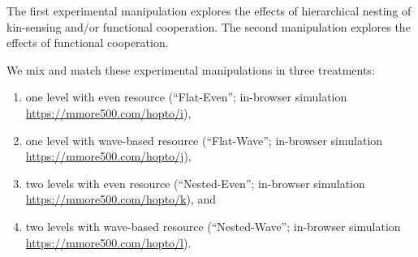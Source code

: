 The first experimental manipulation explores the effects of hierarchical nesting of kin-sensing and/or functional cooperation.
The second manipulation explores the effects of functional cooperation.

We mix and match these experimental manipulations in three treatments:
\begin{enumerate}
\item one level with even resource (``Flat-Even''; in-browser simulation \url{https://mmore500.com/hopto/i}),
\item one level with wave-based resource (``Flat-Wave''; in-browser simulation \url{https://mmore500.com/hopto/j}),
\item two levels with even resource (``Nested-Even''; in-browser simulation \url{https://mmore500.com/hopto/k}), and
\item two levels with wave-based resource (``Nested-Wave''; in-browser simulation \url{https://mmore500.com/hopto/l}).
\end{enumerate}
